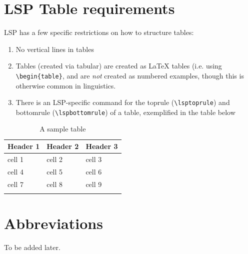 \documentclass[output=paper,colorlinks,citecolor=brown]{langscibook}
\begin{document}
\section{LSP Table requirements}

LSP has a few specific restrictions on how to structure tables: 

\begin{enumerate}
    
    \item No vertical lines in tables
    
    \item Tables (created via tabular) are created as \LaTeX{} tables (i.e. using
    \verb|\begin{table}|, and are \textit{not} created as numbered examples, though this is otherwise common in linguistics.
    
    \item There is an LSP-specific command for the toprule (\verb|\lsptoprule|) and bottomrule (\verb|\lspbottomrule|) of a table, exemplified in the table below

\end{enumerate}
 
\begin{table}

  \caption{A sample table}
  \label{tab:diercks:SampleTableHeaders}
  
\begin{tabular}{lll}
\lsptoprule %
Header 1 & Header 2 & Header 3 \\
\hline\hline
cell 1 & cell 2 & cell 3 \\
\hline
cell 4 & cell 5 & cell 6 \\
\hline
cell 7 & cell 8 & cell 9 \\
\lspbottomrule %


\end{tabular}
\end{table}

\section*{Abbreviations}

To be added later.

\end{document}
